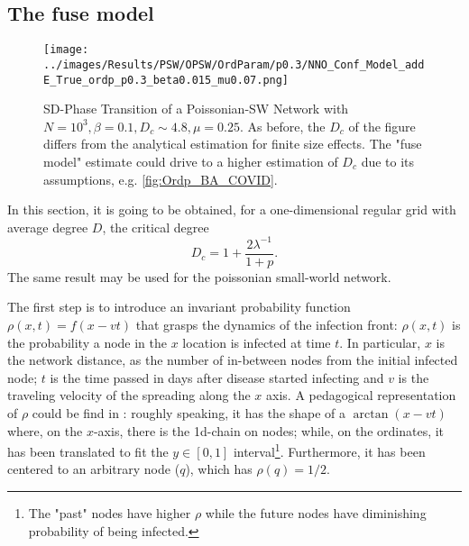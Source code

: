 \documentclass[a4paper,10pt,twoside]{book} %
\theoremstyle{definition}
\begin{document}
\subsection*{The fuse model}
\label{sec:D_c_fuse_model}
\begin{figure}[t]
	\texttt{[image: ../images/Results/PSW/OPSW/OrdParam/p0.3/NNO\_Conf\_Model\_addE\_True\_ordp\_p0.3\_beta0.015\_mu0.07.png]}
	\centering
	\caption{SD-Phase Transition of a Poissonian-SW Network with $N = 10^{3}, \beta = 0.1, D_c \sim 4.8, \mu = 0.25$. As before, the $D_c$ of the figure differs from the analytical estimation for finite size effects. The "fuse model" estimate could drive to a higher estimation of $ D_c$ due to its assumptions, e.g. \autoref{fig:Ordp_BA_COVID}.}
	\label{fig:SD_Threshold_Fuse_Model}
\end{figure}

In this section, it is going to be obtained, for a one-dimensional regular grid with average degree $D$, the critical degree \cite{Thurner::NetBasedExpl} 
\begin{equation}
	D_c = 1 + \frac{2 \lambda^{-1}}{1+p}.
	\label{eq:Dc_PSW_network}
\end{equation}
The same result may be used for the poissonian small-world network.

The first step is to introduce an invariant probability function $\rho(x,t) = f(x-vt)$ that grasps the dynamics of the infection front: $\rho(x,t)$ is the probability a node in the $x$ location is infected at time $t$.
In particular, $x$ is the network distance, as the number of in-between nodes from the initial infected node; $t$ is the time passed in days after disease started infecting and $v$ is the traveling velocity of the spreading along the $x$ axis.
A pedagogical representation of $\rho$ could be find in \cite{Thurner::Appendix_NetBasedExpl}: roughly speaking, it has the shape of a $\arctan(x-vt)$ where, on the $x$-axis, there is the 1d-chain on  nodes; while, on the ordinates, it has been translated to fit the $y \in [0,1]$ interval\footnote{The "past" nodes have higher $\rho$ while the future nodes have diminishing probability of being infected.}.   Furthermore, it has been centered to an arbitrary node ($q$), which has $\rho(q) = 1/2$.
\end{document}
